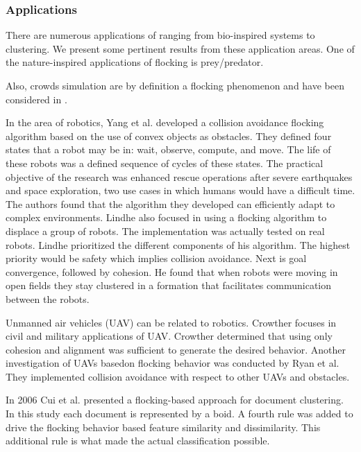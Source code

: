 \subsubsection{Applications}
There are numerous applications of  
ranging from bio-inspired systems to clustering. 
We present some pertinent results from these application areas. 
One of the nature-inspired applications of flocking is prey/predator\cite{gems2}. 
{ Also, crowds simulation are by definition a flocking phenomenon and have been 
considered in \cite{crowdsPS3}. 

In the area of robotics, Yang et al. developed a collision avoidance flocking algorithm 
based on the use of convex objects as obstacles\cite{flockingRobots}. They defined four states that a robot may be in: wait, observe, compute, and move. The life of these robots was a defined sequence of cycles of these states. The practical objective of the research was 
enhanced rescue operations after severe earthquakes and space exploration, two use
cases in which humans would have a difficult time. The authors found that the algorithm they developed can efficiently adapt to complex environments. Lindhe also focused in using a flocking algorithm to displace a group of robots. The implementation was actually tested on 
real robots\cite{flockingRobotsThesis}. Lindhe prioritized the different components 
of his algorithm. 
The highest priority would be safety which implies collision avoidance. Next is 
goal convergence, followed by cohesion. He found that when robots were moving in open fields they stay clustered in a formation that facilitates communication between the robots. 

Unmanned air vehicles (UAV) can be related to robotics. Crowther focuses in civil and military applications of  UAV\cite{flockingUAV}. Crowther determined that using only cohesion and alignment was sufficient to generate the desired behavior. Another investigation of UAVs basedon flocking behavior was conducted by Ryan et al\cite{UAVControl}.  They implemented collision avoidance with respect to other UAVs and obstacles. 

In 2006 Cui et al. presented a flocking-based approach for document clustering\cite{document1}. In this study each document is represented by a boid. A fourth rule was added to drive the flocking behavior  based  feature similarity and dissimilarity. This 
additional rule is what made the actual classification possible. 

}
